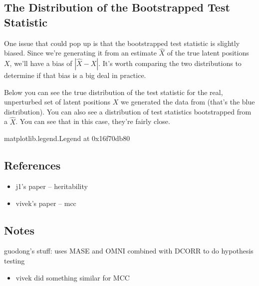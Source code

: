 \documentclass[letterpaper,10pt,english]{jupyterBook}
\begin{document}
\subsection{The Distribution of the Bootstrapped Test Statistic}
\label{\detokenize{applications/ch10/anomaly-detection:the-distribution-of-the-bootstrapped-test-statistic}}
\sphinxAtStartPar
One issue that could pop up is that the bootstrapped test statistic is slightly biased. Since we’re generating it from an estimate \(\hat{X}\) of the true latent positions \(X\), we’ll have a bias of \(|\hat{X} - X|\). It’s worth comparing the two distributions to determine if that bias is a big deal in practice.

\sphinxAtStartPar
Below you can see the true distribution of the test statistic for the real, unperturbed set of latent positions \(X\) we generated the data from (that’s the blue distribution). You can also see a distribution of test statistics bootstrapped from a \(\hat{X}\). You can see that in this case, they’re fairly close.

\begin{sphinxVerbatim}[commandchars=\\\{\}]
\PYGZlt{}matplotlib.legend.Legend at 0x16f70db80\PYGZgt{}
\end{sphinxVerbatim}

\noindent{}


\subsection{}
\label{\detokenize{applications/ch10/anomaly-detection:id1}}

\subsection{References}
\label{\detokenize{applications/ch10/anomaly-detection:references}}\begin{itemize}
\item {} 
\sphinxAtStartPar
j1’s paper – heritability

\item {} 
\sphinxAtStartPar
vivek’s paper – mcc

\end{itemize}


\subsection{Notes}
\label{\detokenize{applications/ch10/anomaly-detection:notes}}
\sphinxAtStartPar
guodong’s stuff: uses MASE and OMNI combined with DCORR to do hypothesis testing
\begin{itemize}
\item {} 
\sphinxAtStartPar
vivek did something similar for MCC

\end{itemize}
\end{document}
